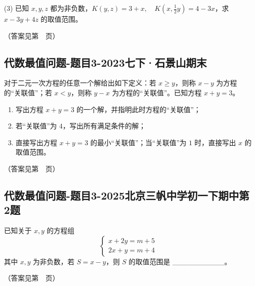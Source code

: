 \vspace{5cm}

(3) 已知 \(x, y, z\) 都为非负数，\(K(y, z) = 3 + x, \quad K\left(x, \frac{1}{2}y\right) = 4 - 3x\)，求 \(x - 3y + 4z\) 的取值范围。

\vspace{8cm}

（答案见第~\pageref{代数最值问题-题目2}~页）



\subsection{代数最值问题-题目3-2023七下·石景山期末}

对于二元一次方程的任意一个解给出如下定义：若 \(x \geq y\)，则称 \(x - y\) 为方程的“关联值”；若 \(x < y\)，则称 \(y - x\) 为方程的“关联值”。已知方程 \(x + y = 3\)。

\begin{enumerate}
    \item 写出方程 \(x + y = 3\) 的一个解，并指明此时方程的“关联值”；
    \vspace{3cm}
    \item 若“关联值”为 \(4\)，写出所有满足条件的解；
    \vspace{5cm}
    \item 直接写出方程 \(x + y = 3\) 的最小“关联值”；当“关联值”为 \(1\) 时，直接写出 \(x\) 的取值范围。
    \vspace{8cm}
\end{enumerate}

（答案见第~\pageref{代数最值问题-题目3-2023七下·石景山期末}~页）


\subsection{代数最值问题-题目3-2025北京三帆中学初一下期中第2题}

已知关于 \(x, y\) 的方程组
\[
\begin{cases}
x + 2y = m + 5 \\
2x + y = m + 4
\end{cases}
\]
其中 \(x, y\) 为非负数，若 \(S = x - y\)，则 \(S\) 的取值范围是 \_\_\_\_\_\_\_\_\_\_。

\vspace{8cm}


（答案见第~\pageref{代数最值问题-题目3-2025北京三帆中学初一下期中第2题}~页）
